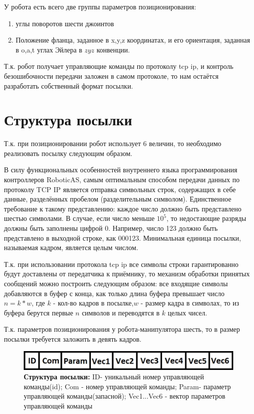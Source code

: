 \documentclass[a4paper,14pt,russian]{extreport} \usepackage{extsizes}
\begin{document}
		У робота есть всего две группы параметров позиционирования: 
		\begin{enumerate}
			
		\item{ углы поворотов шести джоинтов }
		\item{ Положение фланца, заданное в x,y,z координатах, и его ориентация, заданная в o,a,t углах  Эйлера в $zyz$ конвенции.}
		\end{enumerate}
			
		Т.к. робот получает управляющие команды по протоколу tcp ip, и контроль безошибочности передачи заложен в самом протоколе, то нам остаётся разработать собственный формат посылки.
		\section{Структура посылки}
		Т.к. при позиционировании робот использует 6 величин, то необходимо реализовать посылку следующим образом.
		
		В силу функциональных особенностей внутреннего языка программирования контроллеров RoboticAS, самым оптимальным способом передачи данных по протоколу TCP IP является отправка символьных строк, содержащих в себе данные, разделённых пробелом (разделительным символом).  Единственное требование к такому представлению: каждое число должно быть представлено шестью символами. В случае, если число меньше $10^5$, то недостающие разряды должны быть заполнены цифрой 0. Например, число 123 должно быть представлено в выходной строке, как 000123.
		Минимальная единица посылки, называемая кадром, является целым числом. 
		
		Т.к. при использовании протокола tcp ip все символы строки гарантированно будут доставлены от передатчика к приёмнику, то механизм обработки принятых сообщений можно построить следующим образом: все входящие символы добавляются в буфер с конца, как только длина буфера превышает число $n=k*w$, где $k$ - кол-во кадров в посылке,$w$ - размер кадра в символах, то из буфера берутся первые $n$ символов и переводятся в $k$ целых чисел.
		
		Т.к. параметров позиционирования у робота-манипулятора шесть, то в размер посылки требуется заложить в девять кадров.
		
		\begin{figure}[ht]
			\centering		 
			\includegraphics{./img/img41.jpg}	
			\caption{
				\textbf{ Структура посылки:} 				
				ID- уникальный  номер управляющей команды(id);	 				
				Com - номер управляющей команды;	 				
				Param- параметр управляющей команды(запасной);	 				
				Vec1...Vec6 - вектор параметров управляющей команды}     
			\label{fig_img51}
		\end{figure}
		
\end{document}
